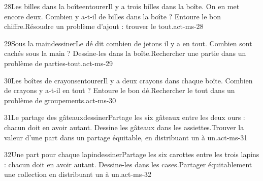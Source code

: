 \begin{activite}{28}{Les billes dans la boîte}{entourer}{Il y a trois billes dans la boîte. On en met encore deux. Combien y a-t-il de billes dans la boîte ? {\otBold\color{otNavy}Entoure} le bon chiffre.}{Résoudre un problème d’ajout : trouver le tout.}{act-ms-28}
\end{activite}
\begin{activite}{29}{Sous la main}{dessiner}{Le dé dit combien de jetons il y a en tout. Combien sont cachés sous la main ? {\otBold\color{otNavy}Dessine-les} dans la boîte.}{Rechercher une partie dans un problème de parties-tout.}{act-ms-29}
\end{activite}
\begin{activite}{30}{Les boîtes de crayons}{entourer}{Il y a deux crayons dans chaque boîte. Combien de crayons y a-t-il {\otBold\color{otNavy}en tout} ? Entoure le bon dé.}{Rechercher le tout dans un problème de groupements.}{act-ms-30}
\end{activite}
\begin{activite}{31}{Le partage des gâteaux}{dessiner}{Partage les six gâteaux entre les deux ours : chacun doit en avoir {\otBold\color{otNavy}autant}. Dessine les gâteaux dans les assiettes.}{Trouver la valeur d’une part dans un partage équitable, en distribuant un à un.}{act-ms-31}
\end{activite}
\begin{activite}{32}{Une part pour chaque lapin}{dessiner}{Partage les six carottes entre les trois lapins : chacun doit en avoir {\otBold\color{otNavy}autant}. Dessine-les dans les cases.}{Partager équitablement une collection en distribuant un à un.}{act-ms-32}
\end{activite}
